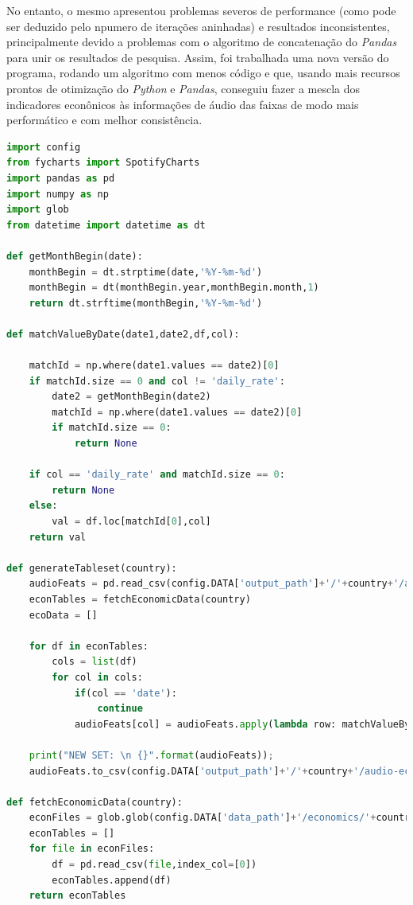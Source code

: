 No entanto, o mesmo apresentou problemas severos de performance (como pode ser deduzido pelo npumero de iterações aninhadas) e resultados inconsistentes, principalmente devido a problemas com o algoritmo de concatenação do \textit{Pandas} para unir os resultados de pesquisa. Assim, foi trabalhada uma nova versão do programa, rodando um algoritmo com menos código e que, usando mais recursos prontos de otimização do \textit{Python} e \textit{Pandas}, conseguiu fazer a mescla dos indicadores econônicos às informações de áudio das faixas de modo mais performático e com melhor consistência.

\begin{lstlisting}[language=Python, caption=Script de mesclagem entre os dados da análise de áudio e indicadores econômicos]
import config
from fycharts import SpotifyCharts
import pandas as pd
import numpy as np
import glob
from datetime import datetime as dt

def getMonthBegin(date):
	monthBegin = dt.strptime(date,'%Y-%m-%d')
	monthBegin = dt(monthBegin.year,monthBegin.month,1)
	return dt.strftime(monthBegin,'%Y-%m-%d')

def matchValueByDate(date1,date2,df,col):

	matchId = np.where(date1.values == date2)[0]
	if matchId.size == 0 and col != 'daily_rate':
		date2 = getMonthBegin(date2)
		matchId = np.where(date1.values == date2)[0]
		if matchId.size == 0:
			return None

	if col == 'daily_rate' and matchId.size == 0:
		return None
	else:
		val = df.loc[matchId[0],col]
	return val

def generateTableset(country):
	audioFeats = pd.read_csv(config.DATA['output_path']+'/'+country+'/audio-features.csv')
	econTables = fetchEconomicData(country)
	ecoData = []

	for df in econTables:
		cols = list(df)
		for col in cols:
			if(col == 'date'):
				continue
			audioFeats[col] = audioFeats.apply(lambda row: matchValueByDate(df['date'],row['date'],df,col),axis=1)

	print("NEW SET: \n {}".format(audioFeats));
	audioFeats.to_csv(config.DATA['output_path']+'/'+country+'/audio-economic-features.csv')

def fetchEconomicData(country):
	econFiles = glob.glob(config.DATA['data_path']+'/economics/'+country+'/*')
	econTables = []
	for file in econFiles:
		df = pd.read_csv(file,index_col=[0])
		econTables.append(df)
	return econTables
\end{lstlisting}

